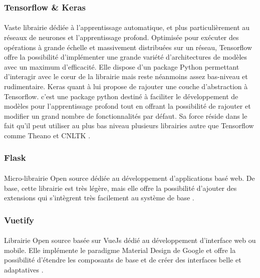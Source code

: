 		\subsubsection*{Tensorflow \& Keras}\label{tf&keras}
		\paragraph{}
		Vaste librairie dédiée à l'apprentissage automatique, et plus particulièrement au réseaux de neurones et l'apprentissage profond. Optimisée pour exécuter des opérations à grande échelle et massivement distribuées sur un réseau, Tensorflow offre la possibilité d'implémenter une grande variété d'architectures de modèles avec un maximum d'efficacité. Elle dispose d'un package Python permettant d'interagir avec le cœur de la librairie mais reste néanmoins assez bas-niveau et rudimentaire. Keras quant à lui propose de rajouter une couche d'abstraction à Tensorflow. c'est une package python destiné à faciliter le développement de modèles pour l'apprentissage profond tout en offrant la possibilité de rajouter et modifier un grand nombre de fonctionnalités par défaut. Sa force réside dans le fait qu'il peut utiliser au plus bas niveau plusieurs librairies autre que Tensorflow comme Theano et CNLTK \cite{tf,keras,theano,cnltk}.
		
		\subsubsection*{Flask}
		\paragraph{}
		Micro-librairie Open source dédiée au développement d'applications basé web. De base, cette librairie est très légère, mais elle offre la possibilité d'ajouter des extensions qui s'intègrent très facilement au système de base \cite{flask}.
		
		\subsubsection*{Vuetify}
		\paragraph{}
		Librairie Open source basée sur VueJs dédié au développement d'interface web ou mobile. Elle implémente le paradigme Material Design de Google et offre la possibilité d'étendre les composants de base et de créer des interfaces belle et adaptatives \cite{vuetify}.
